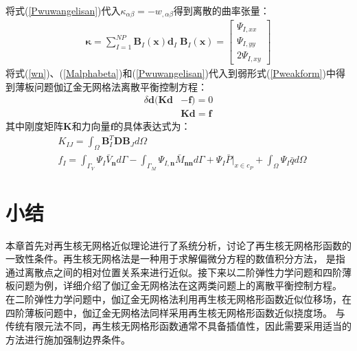 将式(\ref{Pwuwangelisan})代入$\kappa_{\alpha\beta}=-w_{,\alpha\beta}$得到离散的曲率张量：
\begin{equation}
\begin{split}
\pmb{\kappa}=\sum_{I=1}^{N\!P}\pmb{B}_I(\pmb{x})\pmb{d}_I\;
\pmb{B}_I(\pmb{x})= \left[\begin{matrix}\Psi_{I,xx}\\\Psi_{I,yy}\\2\Psi_{I,xy}\end{matrix}\right] 
\end{split}
\end{equation}
将式(\ref{wn})、(\ref{Malphabeta})和(\ref{Pwuwangelisan})代入到弱形式(\ref{Pweakform})中得到薄板问题伽辽金无网格法离散平衡控制方程：
\begin{equation}
\begin{split}
    \delta\pmb{d}(\pmb{K}\pmb{d}&-\pmb{f})=0\\
     &\pmb{K}\pmb{d}=\pmb{f}
\end{split}
\end{equation}
其中刚度矩阵$\pmb{K}$和力向量$\pmb{f}$的具体表达式为：
\begin{equation}\label{PKf}
\begin{split}
    &K_{IJ}=\int_{\Omega}\pmb{B}^T_I\pmb{D}\pmb{B}_Jd\Omega\\
    &f_I=\int_{\Gamma_V}\Psi_I\bar{V}_{\pmb{n}}d\Gamma-\int_{\Gamma_M}\Psi_{I,\pmb{n}}\bar{M}_{\pmb{nn}}d\Gamma+\Psi_I\bar{P}\vert_{x\in c_P}+\int_{\Omega}\Psi_I\bar{q}d\Omega
\end{split}
\end{equation}
\section{小结}
本章首先对再生核无网格近似理论进行了系统分析，讨论了再生核无网格形函数的一致性条件。再生核无网格法是一种用于求解偏微分方程的数值积分方法，
是指通过离散点之间的相对位置关系来进行近似。接下来以二阶弹性力学问题和四阶薄板问题为例，详细介绍了伽辽金无网格法在这两类问题上的离散平衡控制方程。
在二阶弹性力学问题中，伽辽金无网格法利用再生核无网格形函数近似位移场，在四阶薄板问题中，伽辽金无网格法同样采用再生核无网格形函数近似挠度场。
与传统有限元法不同，再生核无网格形函数通常不具备插值性，因此需要采用适当的方法进行施加强制边界条件。
